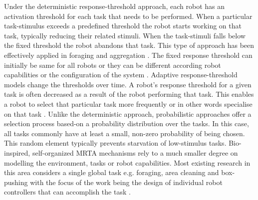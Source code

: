 \documentclass[journal]{IEEEtran}
\begin{document}
Under the deterministic response-threshold approach, each robot has an activation threshold for each task that needs to be performed.
When a particular task-stimulus exceeds a predefined threshold the robot starts working on that task, typically reducing their related stimuli. When the task-stimuli falls below the fixed threshold the robot abandons that task. This type of approach has been effectively applied in foraging \cite{Liu+2007,Krieger+2000} and aggregation \cite{Agassounon+2002}. The fixed response threshold can initially be same for all robots \cite{Jones+2000} or they can be different according robot capabilities or the configuration of the system \cite{Krieger+2000}. Adaptive response-threshold models change the thresholds over time.  A robot's response threshold for a given task is often decreased as a result of the robot performing that task.  This enables a robot to select that particular task more frequently or in other words specialise on that task \cite{Bonabeau+1999,Agassounon+2002}. Unlike the deterministic approach, probabilistic approaches offer a selection process based-on a probability distribution over the tasks.  In this case, all tasks commonly have at least a small, non-zero probability of being chosen.  This random element typically prevents starvation of low-stimulus tasks.
Bio-inspired, self-organized MRTA mechanisms rely to a much smaller degree on modelling the environment, tasks or robot capabilities.  Most existing research in this area considers a single global task e.g. foraging, area cleaning and box-pushing with the focus of the work being the design of individual robot controllers that can accomplish the task \cite{Gerkey+2003}. %
\end{document}
